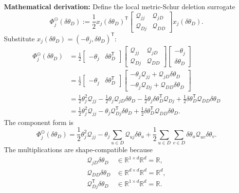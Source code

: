\documentclass[10pt,twocolumn]{article}
\newcommand{\blocktitle}[1]{\vspace{2pt}\noindent\textbf{#1}\space}
\newcommand{\deriv}{\blocktitle{Mathematical derivation:}}
\begin{document}
\deriv
Define the local metric-Schur deletion surrogate
\[
\Phi_j^\ominus(\delta\theta_D)
:=
\frac12
x_j(\delta\theta_D)^{\mathsf T}
\begin{bmatrix}
\mathcal Q_{jj} & \mathcal Q_{jD}\\
\mathcal Q_{Dj} & \mathcal Q_{DD}
\end{bmatrix}
x_j(\delta\theta_D).
\]
Substitute \(x_j(\delta\theta_D)=(-\theta_j,\delta\theta_D)^{\mathsf T}\):
{\scriptsize
\[
\begin{aligned}
\Phi_j^\ominus(\delta\theta_D)
&=
\frac12
\begin{bmatrix}
-\theta_j & \delta\theta_D^{\mathsf T}
\end{bmatrix}
\begin{bmatrix}
\mathcal Q_{jj} & \mathcal Q_{jD}\\
\mathcal Q_{Dj} & \mathcal Q_{DD}
\end{bmatrix}
\begin{bmatrix}
-\theta_j\\
\delta\theta_D
\end{bmatrix}
\\
&=
\frac12
\begin{bmatrix}
-\theta_j & \delta\theta_D^{\mathsf T}
\end{bmatrix}
\begin{bmatrix}
-\theta_j\mathcal Q_{jj}+\mathcal Q_{jD}\delta\theta_D\\
-\theta_j\mathcal Q_{Dj}+\mathcal Q_{DD}\delta\theta_D
\end{bmatrix}
\\
&=
\frac12\theta_j^2\mathcal Q_{jj}
-\frac12\theta_j\mathcal Q_{jD}\delta\theta_D
-\frac12\theta_j\delta\theta_D^{\mathsf T}\mathcal Q_{Dj}
+\frac12\delta\theta_D^{\mathsf T}\mathcal Q_{DD}\delta\theta_D
\\
&=
\frac12\theta_j^2\mathcal Q_{jj}
-\theta_j\mathcal Q_{Dj}^{\mathsf T}\delta\theta_D
+\frac12\delta\theta_D^{\mathsf T}\mathcal Q_{DD}\delta\theta_D .
\end{aligned}
\]
}
The component form is
\[
\Phi_j^\ominus(\delta\theta_D)
=
\frac12\theta_j^2\mathcal Q_{jj}
-\theta_j\sum_{u\in D}\mathcal Q_{uj}\delta\theta_u
+\frac12\sum_{u\in D}\sum_{v\in D}
\delta\theta_u\mathcal Q_{uv}\delta\theta_v.
\]
The multiplications are shape-compatible because
\[
\begin{aligned}
\mathcal Q_{jD}\delta\theta_D
&\in \mathbb R^{1\times d}\mathbb R^d=\mathbb R,
\\
\mathcal Q_{DD}\delta\theta_D
&\in \mathbb R^{d\times d}\mathbb R^d=\mathbb R^d,
\\
\mathcal Q_{Dj}^{\mathsf T}\delta\theta_D
&\in \mathbb R^{1\times d}\mathbb R^d=\mathbb R .
\end{aligned}
\]
\end{document}
